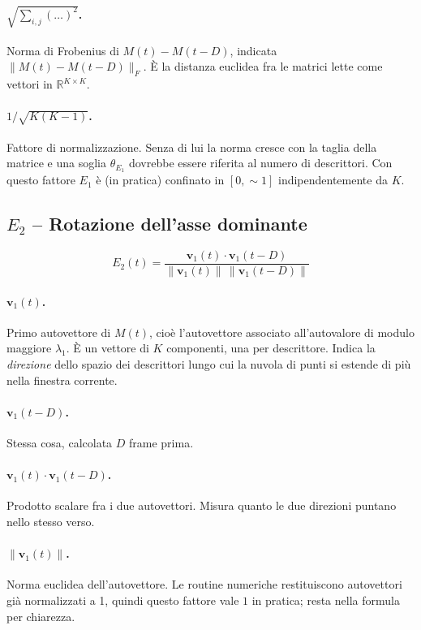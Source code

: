 \documentclass[a4paper,11pt]{article}
\begin{document}
\paragraph{$\sqrt{\sum_{i,j} (\dots)^2}$.} Norma di Frobenius di
$M(t) - M(t-D)$, indicata $\lVert M(t) - M(t-D) \rVert_F$. È la distanza
euclidea fra le matrici lette come vettori in $\mathbb{R}^{K\times K}$.

\paragraph{$1/\sqrt{K(K-1)}$.} Fattore di normalizzazione. Senza di lui
la norma cresce con la taglia della matrice e una soglia $\theta_{E_1}$
dovrebbe essere riferita al numero di descrittori. Con questo fattore
$E_1$ è (in pratica) confinato in $[0, \sim 1]$ indipendentemente da $K$.

\subsection{$E_2$ -- Rotazione dell'asse dominante}

\[
E_2(t) = \frac{\mathbf{v}_1(t) \cdot \mathbf{v}_1(t - D)}
              {\lVert\mathbf{v}_1(t)\rVert\, \lVert\mathbf{v}_1(t-D)\rVert}
\]

\paragraph{$\mathbf{v}_1(t)$.} Primo autovettore di $M(t)$, cioè
l'autovettore associato all'autovalore di modulo maggiore $\lambda_1$.
È un vettore di $K$ componenti, una per descrittore. Indica la
\emph{direzione} dello spazio dei descrittori lungo cui la nuvola di
punti si estende di più nella finestra corrente.

\paragraph{$\mathbf{v}_1(t-D)$.} Stessa cosa, calcolata $D$ frame prima.

\paragraph{$\mathbf{v}_1(t) \cdot \mathbf{v}_1(t-D)$.} Prodotto scalare
fra i due autovettori. Misura quanto le due direzioni puntano nello
stesso verso.

\paragraph{$\lVert\mathbf{v}_1(t)\rVert$.} Norma euclidea
dell'autovettore. Le routine numeriche restituiscono autovettori già
normalizzati a 1, quindi questo fattore vale $1$ in pratica; resta nella
formula per chiarezza.
\end{document}
